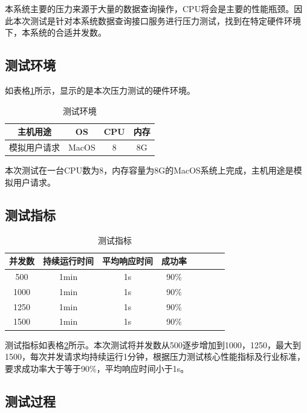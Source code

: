 \documentclass[oneside]{xduugthesis}
\begin{document}
本系统主要的压力来源于大量的数据查询操作，CPU将会是主要的性能瓶颈。因此本次测试是针对本系统数据查询接口服务进行压力测试，找到在特定硬件环境下，本系统的合适并发数。

\subsection{测试环境}

如表格\ref{tab:jmeter-test-env}所示，显示的是本次压力测试的硬件环境。

\begin{table}[htb]
    \centering
    \caption{测试环境}
    \begin{tabular}{cccc}\hline
         主机用途     & OS & CPU & 内存 \\\hline
         模拟用户请求 & MacOS & 8 & 8G \\\hline
    \end{tabular}
    \label{tab:jmeter-test-env}
\end{table}

本次测试在一台CPU数为8，内存容量为8G的MacOS系统上完成，主机用途是模拟用户请求。

\subsection{测试指标}

\begin{table}[htb]
    \centering
    \caption{测试指标}
    \begin{tabular}{cccccccc}\hline
         并发数 & 持续运行时间 & 平均响应时间  & 成功率 \\\hline
         500    & 1min       & \<1s &    90\% \\\hline
         1000   & 1min       & \<1s &	90\% \\\hline
         1250   & 1min       & \<1s &    90\% \\\hline
         1500  & 1min       & \<1s &	90\% \\\hline
    \end{tabular}
    \label{tab:jmeter-test-aim}
\end{table}

测试指标如表格\ref{tab:jmeter-test-aim}所示。本次测试将并发数从500逐步增加到1000，1250，最大到1500，每次并发请求均持续运行1分钟，根据\cite{压力测试核心性能指标及行业标准}压力测试核心性能指标及行业标准，要求成功率大于等于90\%，平均响应时间小于1s。

\subsection{测试过程}
\end{document}
